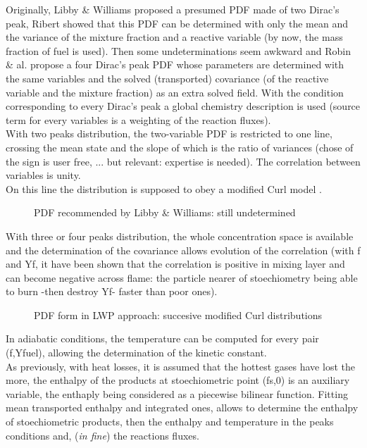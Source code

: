 Originally, Libby \& Williams proposed a presumed PDF made of two
Dirac's peak, Ribert showed that this PDF can be determined with only
the mean and the variance of the mixture fraction and a reactive
variable ({\small by now, the mass fraction of fuel is used}). Then
some undeterminations seem awkward and Robin \& al. propose a four
Dirac's peak PDF whose parameters are determined with the same
variables and the solved ({\small transported}) covariance ({\small of
the reactive variable and the mixture fraction}) as an extra solved
field. With the condition corresponding to every Dirac's peak a global
chemistry description is used ({\small source term for every variables
is a weighting of the reaction fluxes}).\\ With two peaks
distribution, the two-variable PDF is restricted to one line, crossing
the mean state and the slope of which is the ratio of variances
({\small chose of the sign is user free, ... but relevant: expertise
is needed}). The correlation between variables is unity.\\ On this
line the distribution is supposed to obey a modified Curl
model \cite{7}.\\
\begin{figure}[h]
\caption{PDF recommended by Libby \& Williams: still undetermined}
\end{figure}
With three or four peaks distribution, the whole concentration space
is available and the determination of the covariance allows evolution
of the correlation ({\small with f and Yf, it have been shown that the
correlation is positive in mixing layer and can become negative across
flame: the particle nearer of stoechiometry being able to burn -then
destroy Yf- faster than poor ones}). \\
\begin{figure}[h]
\caption{PDF form in LWP approach: succesive modified Curl distributions}
\end{figure}
In adiabatic conditions, the temperature can be computed for every
pair (f,Yfuel), allowing the determination of the kinetic constant.\\
As previously, with heat losses, it is assumed that the hottest gases
have lost the more, the enthalpy of the products at stoechiometric
point (fs,0) is an auxiliary variable, the enthaply being considered
as a piecewise bilinear function. Fitting mean transported enthalpy
and integrated ones, allows to determine the enthalpy of
stoechiometric products, then the enthalpy and temperature in the
peaks conditions and, ({\em in fine}) the reactions fluxes.




